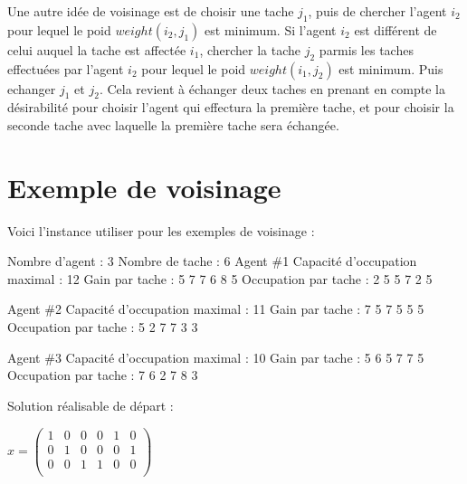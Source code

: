 \documentclass{article}
\begin{document}
Une autre idée de voisinage est de choisir une tache $j_{1}$, puis de chercher l'agent $i_{2}$ pour lequel le poid $weight(i_{2},j_{1})$ est minimum. Si l'agent $i_{2}$ est différent de celui auquel la tache est affectée $i_{1}$, chercher la tache $j_{2}$ parmis les taches effectuées par l'agent $i_{2}$ pour lequel le poid $weight(i_{1},j_{2})$ est minimum. Puis echanger $j_{1}$ et $j_{2}$.
Cela revient à échanger deux taches en prenant en compte la désirabilité pour choisir l'agent qui effectura la première tache, et pour choisir la seconde tache avec laquelle la première tache sera échangée.



\section{Exemple de voisinage}

Voici l'instance utiliser pour les exemples de voisinage :

Nombre d'agent : 3
Nombre de tache : 6
Agent \#1
Capacité d'occupation maximal : 12
Gain par tache : 		5	7	7	6	8	5
Occupation par tache :	2	5	5	7	2	5

Agent \#2
Capacité d'occupation maximal : 11
Gain par tache : 		7	5	7	5	5	5
Occupation par tache :	5	2	7	7	3	3

Agent \#3
Capacité d'occupation maximal : 10
Gain par tache : 		5	6	5	7	7	5
Occupation par tache :	7	6	2	7	8	3

Solution réalisable de départ :

$x = \begin{pmatrix}
 1&0&0&0&1&0 \\
 0&1&0&0&0&1 \\
 0&0&1&1&0&0 \\
\end{pmatrix}$
\end{document}
